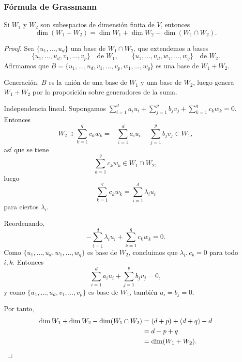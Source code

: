 \begin{frame}[allowframebreaks, t]
    \frametitle{Fórmula de Grassmann}

    \begin{theorem}
        Si $W_1$ y $W_2$ son subespacios de dimensión finita de $V$, entonces
        \[
            \dim(W_1+W_2)=\dim W_1+\dim W_2-\dim(W_1\cap W_2).
        \]
    \end{theorem}

    \begin{proof}
        Sea $\{u_1,\ldots,u_d\}$ una base de $W_1\cap W_2$, que
        extendemos a bases
        \[
            \{u_1,\ldots,u_d,v_1,\ldots,v_p\}\quad\text{de }W_1,
            \qquad
            \{u_1,\ldots,u_d,w_1,\ldots,w_q\}\quad\text{de }W_2.
        \]
        Afirmamos que $B=\{u_1,\ldots,u_d,v_1,\ldots,v_p,w_1,\ldots,w_q\}$
        es una base de $W_1+W_2$.

        \alert{Generación.}
        $B$ es la unión de una base de $W_1$ y una base de $W_2$,
        luego genera $W_1+W_2$ por la proposición sobre generadores
        de la suma.

        \alert{Independencia lineal.}
        Supongamos $\sum_{i=1}^{d} a_i u_i+\sum_{j=1}^{p} b_j v_j+\sum_{k=1}^{q} c_k w_k=0$.
        Entonces
        \[
            W_2\ni\sum_{k=1}^{q} c_k w_k=-\sum_{i=1}^{d} a_i u_i-\sum_{j=1}^{p} b_j v_j\in W_1,
        \]
        así que se tiene \[\sum_{k=1}^{q} c_k w_k\in W_1\cap W_2,\]
        luego \[\sum_{k=1}^{q} c_k w_k=\sum_{i=1}^{d}\lambda_i u_i\] para ciertos $\lambda_i$.

        \framebreak

        Reordenando, \[-\sum_{i=1}^{d}\lambda_i u_i+\sum_{k=1}^{q} c_k w_k=0.\]
        Como $\{u_1,\ldots,u_d,w_1,\ldots,w_q\}$ es base de $W_2$,
        concluimos que $\lambda_i, c_k=0$ para todo $i,k$.
        Entonces \[\sum_{i=1}^{d} a_i u_i+\sum_{j=1}^{p} b_j v_j=0,\] y como
        $\{u_1,\ldots,u_d,v_1,\ldots,v_p\}$ es base de $W_1$,
        también $a_i=b_j=0$.

        Por tanto,
        \begin{align*}
            \dim W_1 + \dim W_2 - \dim(W_1\cap W_2)
            &= (d+p) + (d+q) - d \\
            &= d + p + q \\
            &= \dim(W_1+W_2).\qedhere
        \end{align*}
    \end{proof}
\end{frame}


